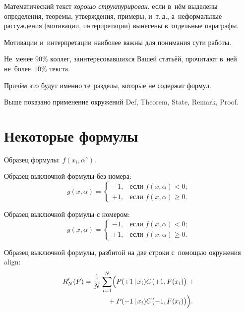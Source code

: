 \documentclass[12pt,twoside]{article}
\begin{document}
\begin{Def}
    Математический текст \emph{хорошо структурирован},
    если в~нём выделены определения, теоремы, утверждения, примеры, и~т.\,д.,
    а~неформальные рассуждения (мотивации, интерпретации)
    вынесены в~отдельные параграфы.
\end{Def}

\begin{State}
    Мотивации и~интерпретации наиболее важны для понимания сути работы.
\end{State}

\begin{Theorem}
    Не~менее $90\%$ коллег, заинтересовавшихся Вашей статьёй,
    прочитают в~ней не~более~$10\%$ текста.
\end{Theorem}

\begin{Proof}
    Причём это будут именно те~разделы, которые не содержат формул.
\end{Proof}

\begin{Remark}
    Выше показано применение окружений
    Def, Theorem, State, Remark, Proof.
\end{Remark}

\section{Некоторые формулы}

Образец формулы: $f(x_i,\alpha^\gamma)$.

Образец выключной формулы без номера:
\[
    y(x,\alpha) =
    \begin{cases}
        -1, & \text{если } f(x,\alpha)<0;  \\
        +1, & \text{если } f(x,\alpha)\geq 0.
    \end{cases}
\]

Образец выключной формулы с номером:
\begin{equation}
\label{eq:cases}
    y(x,\alpha) =
    \begin{cases}
        -1, & \text{если } f(x,\alpha)<0;  \\
        +1, & \text{если } f(x,\alpha)\geq 0.
    \end{cases}
\end{equation}

Образец выключной формулы, разбитой на две строки с~помощью окружения align:
\begin{align}
    R'_N(F)
        = \frac1N \sum_{i=1}^N
        \Bigl(
            & P(+1\cond x_i) C\bigl(+1,F(x_i)\bigr)+{}
        \notag %
    \\ {}+{}
            & P(-1\cond x_i) C\bigl(-1,F(x_i)\bigr)
        \Bigr).
        \label{eq:R(F)}
\end{align}
\end{document}
